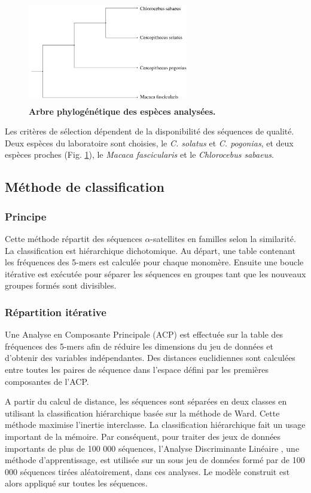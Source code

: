 \documentclass[12pt,a4paper]{article}
\begin{document}
	\begin{figure}
		\center
		\includegraphics[height=4.5cm, width=7cm]{img/arbre_especes.png}
		\caption{\textbf{Arbre phylogénétique des espèces analysées.}\cite{Cacheux_evolution}
		\label{fig:arbre_presentation}}
	\end{figure}

Les critères de sélection dépendent de la disponibilité des séquences de qualité. Deux espèces du laboratoire sont choisies, le \textit{C. solatus} et \textit{C. pogonias}, et deux espèces proches (Fig. \ref{fig:arbre_presentation}), le \textit{Macaca fascicularis} et le \textit{Chlorocebus sabaeus}.  

\subsection{Méthode de classification}
	\subsubsection{Principe}
Cette méthode \cite{rapport_florence} répartit des séquences $\alpha$-satellites en familles selon la similarité. La classification est hiérarchique dichotomique. Au départ, une table contenant les fréquences des 5-mers est calculée pour chaque monomère. Ensuite une boucle itérative est exécutée pour séparer les séquences en groupes tant que les nouveaux groupes formés sont divisibles.

	\subsubsection{Répartition itérative}
Une Analyse en Composante Principale (ACP) est effectuée sur la table des fréquences des 5-mers afin de réduire les dimensions du jeu de données et d’obtenir des variables indépendantes. Des distances euclidiennes sont calculées entre toutes les paires de séquence dans l’espace défini par les premières composantes de l’ACP. 

A partir du calcul de distance, les séquences sont séparées en deux classes en utilisant la classification hiérarchique basée sur la méthode de Ward. Cette méthode maximise l’inertie interclasse. La classification hiérarchique fait un usage important de la mémoire. Par conséquent, pour traiter des jeux de données importants de plus de 100 000 séquences, l’Analyse Discriminante Linéaire , une méthode d’apprentissage, est utilisée sur un sous jeu de données formé par de 100 000 séquences tirées aléatoirement, dans ces analyses. Le modèle construit est alors appliqué sur toutes les séquences.
\end{document}
